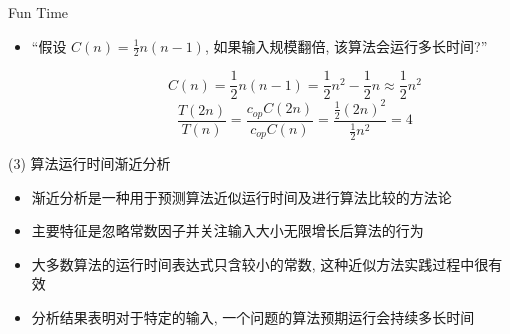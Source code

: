 \documentclass[fontset=fandol,UTF8,12pt,aspectratio=169,fleqn]{beamer}
\begin{document}
\begin{frame}{Fun Time}
\begin{itemize}[<+-|alert@+>]
\item ``假设 $C(n)=\frac{1}{2}n(n-1)$, 如果输入规模翻倍, 该算法会运行多长时间?''  
\end{itemize}\pause
\begin{displaymath}
\hspace{2cm}\    C(n)=\frac{1}{2}n(n-1)=\frac{1}{2}n^2-\frac{1}{2}n\approx \frac{1}{2}n^2 
  \end{displaymath}\pause
  \begin{displaymath}
\hspace{2cm}\    \frac{T(2n)}{T(n)}=\frac{c_{op}C(2n)}{c_{op}C(n)}=\frac{\frac{1}{2}(2n)^2}{\frac{1}{2}n^2}=4  
  \end{displaymath}
\end{frame}

\begin{frame}{(3) 算法运行时间渐近分析}

\begin{itemize}[<+-|alert@+>]
 \item 渐近分析是一种用于预测算法近似运行时间及进行算法比较的方法论  
 \item 主要特征是忽略常数因子并关注输入大小无限增长后算法的行为  
 \item 大多数算法的运行时间表达式只含较小的常数, 这种近似方法实践过程中很有效 
 \item 分析结果表明对于特定的输入, 一个问题的算法预期运行会持续多长时间  
 \end{itemize}
\end{frame}
%
\end{document}
